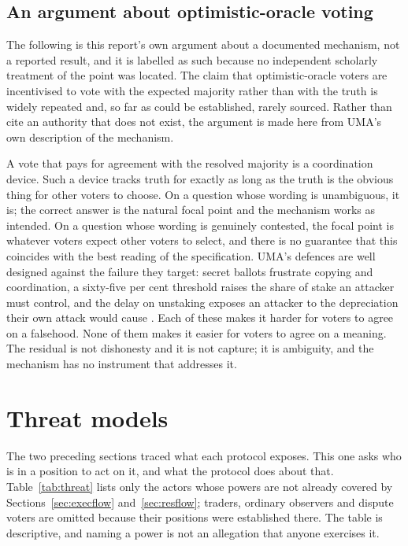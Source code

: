 \subsection{An argument about optimistic-oracle voting}
\label{sec:umaargument}

The following is this report's own argument about a documented mechanism, not a reported
result, and it is labelled as such because no independent scholarly treatment of the point
was located. The claim that optimistic-oracle voters are incentivised to vote with the
expected majority rather than with the truth is widely repeated and, so far as could be
established, rarely sourced. Rather than cite an authority that does not exist, the argument
is made here from UMA's own description of the mechanism.

A vote that pays for agreement with the resolved majority is a coordination device. Such a
device tracks truth for exactly as long as the truth is the obvious thing for other voters
to choose. On a question whose wording is unambiguous, it is; the correct answer is the
natural focal point and the mechanism works as intended. On a question whose wording is
genuinely contested, the focal point is whatever voters expect other voters to select, and
there is no guarantee that this coincides with the best reading of the specification. UMA's
defences are well designed against the failure they target: secret ballots frustrate
copying and coordination, a sixty-five per cent threshold raises the share of stake an
attacker must control, and the delay on unstaking exposes an attacker to the depreciation
their own attack would cause \cite{uma2026oracle}. Each of these makes it harder for voters
to agree on a falsehood. None of them makes it easier for voters to agree on a meaning. The
residual is not dishonesty and it is not capture; it is ambiguity, and the mechanism has no
instrument that addresses it.

\section{Threat models}
\label{sec:threat}

The two preceding sections traced what each protocol exposes. This one asks who is in a
position to act on it, and what the protocol does about that. Table~\ref{tab:threat} lists
only the actors whose powers are not already covered by Sections~\ref{sec:execflow}
and~\ref{sec:resflow}; traders, ordinary observers and dispute voters are omitted because
their positions were established there. The table is descriptive, and naming a power is not
an allegation that anyone exercises it.

